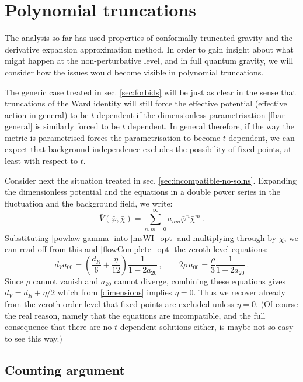 \documentclass[11pt]{book} %
\newcommand{\bc}{\bar \chi}
\newcommand{\be}{\begin{equation}}
\newcommand{\ee}{\end{equation}}
\begin{document}
\section{Polynomial truncations}
\label{sec:truncations}

The analysis  so far has used properties of conformally truncated gravity and the derivative expansion approximation method. In order to gain insight about what might happen at the non-perturbative level, and in full quantum gravity, we will consider how the issues would become visible in polynomial truncations.

The generic case treated in sec. \ref{sec:forbids} will be just as clear in the sense that truncations of the Ward identity will still force the effective potential (effective action in general) to be $t$ dependent if the dimensionless parametrisation \eqref{fbar-general} is similarly forced to be $t$ dependent. In general therefore, if the way the metric is parametrised forces the parametrisation to become $t$ dependent, we can expect that background independence excludes the possibility of fixed points, at least with respect to $t$.


Consider next the situation treated in sec. \ref{sec:incompatible-no-solns}. Expanding the dimensionless potential and the equations in a double power series in the fluctuation and the background field, we write:
\begin{equation}
\label{pot-expand}
\bar V(\bar\varphi,\bar\chi) = \sum_{n,m=0}^{\infty} a_{nm} \bar\varphi^n \bar\chi^m\,.
\end{equation}
Substituting \eqref{powlaw-gamma} into \eqref{msWI_opt} and multiplying through by $\bc$, we can read off from this and \eqref{flowComplete_opt} the zeroth level equations:
\be
d_V a_{00} = \left(  \frac{d_R}{6} + \frac{\eta}{12} \right) \frac{1}{1 -  2a_{20}}\,,\qquad 2\rho\, a_{00} = \frac{\rho}{3} \frac{1}{1 -  2a_{20}}\,.
\ee
Since $\rho$ cannot vanish and $a_{20}$ cannot diverge, combining these equations gives $d_V = d_R+\eta/2$ which from \eqref{dimensions} implies $\eta=0$. Thus we recover already from the zeroth order level that fixed points are excluded unless $\eta=0$. (Of course the real reason, namely that the equations are incompatible, and the full consequence that there are no $t$-dependent solutions either, is maybe not so easy to see this way.)

\subsection{Counting argument}\label{sec:counting}
\end{document}
